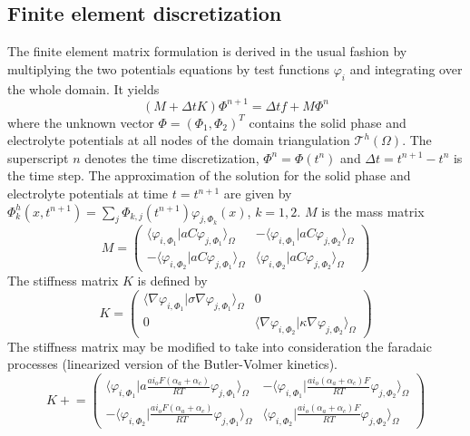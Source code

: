 \subsection{Finite element discretization}

The finite element matrix formulation is derived in the usual fashion by
multiplying the two potentials equations by test functions $\varphi_i$ and
integrating over the whole domain.  It yields
\begin{equation}
    (M + \Delta t K) \Phi^{n+1} = \Delta t f + M \Phi^n
\end{equation}
where the unknown vector $\Phi = (\Phi_1, \Phi_2)^T$ contains the solid phase
and electrolyte potentials at all nodes of the domain triangulation
$\mathcal{T}^h(\Omega)$.  The superscript $n$ denotes the time discretization,
$\Phi^n = \Phi(t^n)$ and $\Delta t = t^{n+1} - t^n$ is the time step.
The approximation of the solution for the solid phase and electrolyte
potentials at time $t=t^{n+1}$ are given by
$\Phi_k^h(x,t^{n+1}) = \sum_j \Phi_{k,j}(t^{n+1}) \varphi_{j,\Phi_k}(x)$, 
$k = 1, 2$.
$M$ is the mass matrix
\begin{equation}
    M =
    \begin{pmatrix}
    \langle \varphi_{i,\Phi_1} \vert aC \varphi_{j,\Phi_1} \rangle_\Omega & - \langle \varphi_{i,\Phi_1} \vert aC \varphi_{j,\Phi_2} \rangle_\Omega \\
    - \langle \varphi_{i,\Phi_2} \vert aC \varphi_{j,\Phi_1} \rangle_\Omega & \langle \varphi_{i,\Phi_2} \vert aC \varphi_{j,\Phi_2} \rangle_\Omega
    \end{pmatrix}
\end{equation}
The stiffness matrix $K$ is defined by
\begin{equation}
    K =
    \begin{pmatrix}
    \langle \nabla \varphi_{i,\Phi_1} \vert \sigma \nabla \varphi_{j,\Phi_1} \rangle_\Omega & 0 \\
    0 & \langle \nabla \varphi_{i,\Phi_2} \vert \kappa \nabla \varphi_{j,\Phi_2} \rangle_\Omega
    \end{pmatrix}
\end{equation}
The stiffness matrix may be modified to take into consideration the faradaic
processes (linearized version of the Butler-Volmer kinetics).
\newcommand{\pluseq}{\mathrel{+}=}
\begin{equation}
    K \pluseq
    \begin{pmatrix}
    \langle \varphi_{i,\Phi_1} \vert a \frac{a i_o  F (\alpha_a + \alpha_c)}{RT} \varphi_{j,\Phi_1} \rangle_\Omega & - \langle \varphi_{i,\Phi_1} \vert \frac{a i_o (\alpha_a + \alpha_c) F}{RT} \varphi_{j,\Phi_2} \rangle_\Omega \\
    - \langle \varphi_{i,\Phi_2} \vert \frac{a i_o  F (\alpha_a + \alpha_c)}{RT} \varphi_{j,\Phi_1} \rangle_\Omega & \langle \varphi_{i,\Phi_2} \vert \frac{a i_o (\alpha_a + \alpha_c) F}{RT} \varphi_{j,\Phi_2} \rangle_\Omega 
    \end{pmatrix}
\end{equation}
